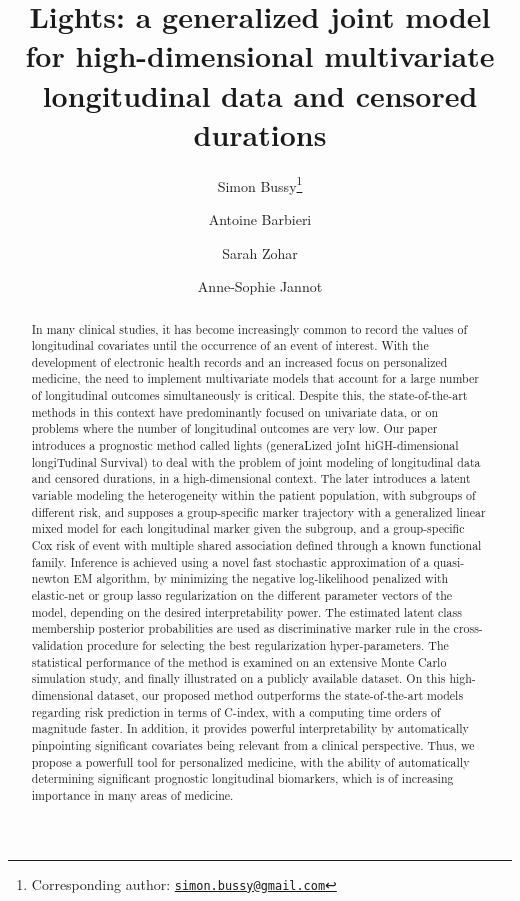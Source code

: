\documentclass[11pt]{article}
\title{\vspace{-.5cm} Lights: a generalized joint model for high-dimensional multivariate longitudinal data and censored durations \vspace{.5cm}}
\author[1]{Simon Bussy\thanks{Corresponding author: \href{mailto:simon.bussy@gmail.com}{\texttt{simon.bussy@gmail.com}}}}
\author[2]{Antoine Barbieri}
\author[1]{Sarah Zohar}
\author[1,3]{Anne-Sophie Jannot}
\affil[1]{INSERM, UMRS 1138, Centre de Recherche des Cordeliers, Paris, France}
\affil[2]{INSERM, UMR 1219, Bordeaux Population Health Research Center, Univ. Bordeaux, France}
\affil[3]{Biomedical Informatics and Public Health Department, EGPH, APHP, Paris, France}
\date{}
\begin{document}
\maketitle

\vspace{-.5cm}

\begin{abstract}

In many clinical studies, it has become increasingly common to record the values of longitudinal covariates until the occurrence of an event of interest. 
With the development of electronic health records and an increased focus on personalized medicine, the need to implement multivariate models that account for a large number of longitudinal outcomes simultaneously is critical. Despite this, the state-of-the-art methods in this context have predominantly focused on univariate data, or on problems where the number of longitudinal outcomes are very low.
Our paper introduces a prognostic method called lights (generaLized joInt hiGH-dimensional longiTudinal Survival) to deal with the problem of joint modeling of longitudinal data and censored durations, in a high-dimensional context. 
The later introduces a latent variable modeling the heterogeneity within the patient population, with subgroups of different risk, and
supposes a group-specific marker trajectory with a generalized linear mixed model for each longitudinal marker given the subgroup, and a group-specific Cox risk of event with multiple shared association defined through a known functional family.
Inference is achieved using a novel fast stochastic approximation of a quasi-newton EM algorithm, by minimizing the negative log-likelihood penalized with elastic-net or group lasso regularization on the different parameter vectors of the model, depending on the desired interpretability power.
The estimated latent class membership posterior probabilities are  used as discriminative marker rule in the cross-validation procedure for selecting the best regularization hyper-parameters.
The statistical performance of the method is examined on an extensive Monte Carlo simulation study, and finally illustrated on a publicly available dataset.
On this high-dimensional dataset, our proposed method outperforms the state-of-the-art models regarding risk prediction in terms of C-index, with a computing time orders of magnitude faster. In addition, it provides powerful interpretability by automatically pinpointing significant covariates being relevant from a clinical perspective. Thus, we propose a powerfull tool for personalized medicine, with the ability of automatically determining significant prognostic longitudinal biomarkers, which is of increasing importance in many areas of medicine.

\end{abstract}
\end{document}
